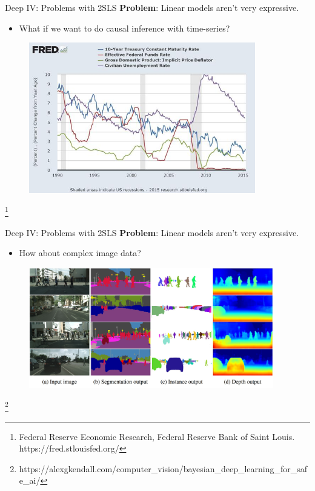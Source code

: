 \documentclass[xcolor={dvipsnames}]{beamer}
\newcommand{\source}[1]{{\let\thefootnote\relax\footnote{{\tiny #1}}}}
\begin{document}
    \begin{frame}{Deep IV: Problems with 2SLS}
        \textbf{Problem}: Linear models aren't very expressive.
        \begin{itemize}
            \item What if we want to do causal inference with time-series?
        \end{itemize}

        \begin{figure}
            \centering
            \includegraphics[width=0.88\textwidth]{figures/interest_vs_unemployment}
        \end{figure}

        \source{Federal Reserve Economic Research, Federal Reserve Bank of Saint Louis. https://fred.stlouisfed.org/}

    \end{frame}

    \begin{frame}{Deep IV: Problems with 2SLS}
        \textbf{Problem}: Linear models aren't very expressive.
        \begin{itemize}
            \item How about complex image data?
        \end{itemize}

        \begin{figure}
            \centering
            \includegraphics[width=0.95\textwidth]{figures/scene_understanding}
        \end{figure}

        \source{https://alexgkendall.com/computer\_vision/bayesian\_deep\_learning\_for\_safe\_ai/}

    \end{frame}
\end{document}
